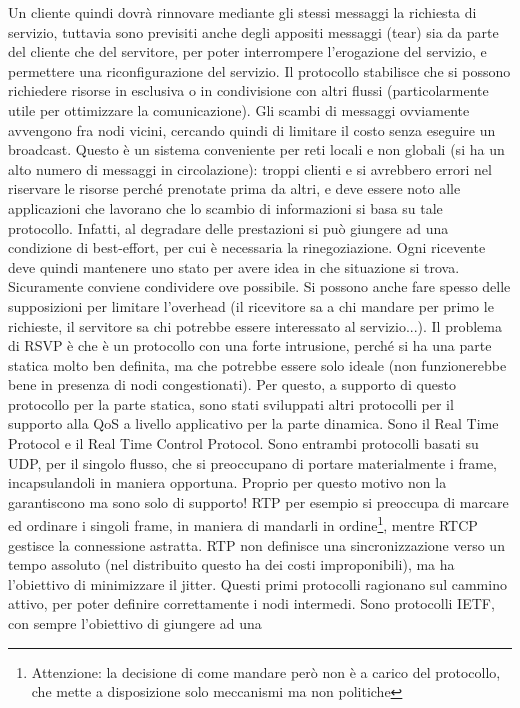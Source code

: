 Un cliente quindi dovrà rinnovare mediante gli stessi messaggi la richiesta di servizio, tuttavia sono previsiti anche
degli appositi messaggi (tear) sia da parte del cliente che del servitore, per poter interrompere l'erogazione del
servizio, e permettere una riconfigurazione del servizio. Il protocollo stabilisce che si possono richiedere risorse 
in esclusiva o in condivisione con altri flussi (particolarmente utile per ottimizzare la comunicazione). Gli scambi 
di messaggi ovviamente avvengono fra nodi vicini, cercando quindi di limitare il costo senza eseguire un broadcast.
Questo è un sistema conveniente per reti locali e non globali (si ha un alto numero di messaggi in circolazione): 
troppi clienti e si avrebbero errori nel riservare le risorse perché prenotate prima da altri, e deve essere noto alle
applicazioni che lavorano che lo scambio di informazioni si basa su tale protocollo. Infatti, al degradare delle
prestazioni si può giungere ad una condizione di best-effort, per cui è necessaria la rinegoziazione. Ogni ricevente
deve quindi mantenere uno stato per avere idea in che situazione si trova. Sicuramente conviene condividere ove
possibile. Si possono anche fare spesso delle supposizioni per limitare l'overhead (il ricevitore sa a chi mandare per
primo le richieste, il servitore sa chi potrebbe essere interessato al servizio...).
Il problema di RSVP è che è un protocollo con una forte intrusione, perché si ha una parte statica molto ben definita,
ma che potrebbe essere solo ideale (non funzionerebbe bene in presenza di nodi congestionati). Per questo, a supporto
di questo protocollo per la parte statica, sono stati sviluppati altri protocolli per il supporto alla QoS a livello
applicativo per la parte dinamica. Sono il Real Time Protocol e il Real Time Control Protocol. Sono entrambi protocolli
basati su UDP, per il singolo flusso, che si preoccupano di portare materialmente i frame, incapsulandoli in maniera
opportuna. Proprio per questo motivo non la garantiscono ma sono solo di supporto! RTP per esempio si preoccupa di
marcare ed ordinare i singoli frame, in maniera di mandarli in ordine\footnote{Attenzione: la decisione di come mandare
però non è a carico del protocollo, che mette a disposizione solo meccanismi ma non politiche}, mentre RTCP gestisce 
la connessione astratta. RTP non definisce una sincronizzazione verso un tempo assoluto (nel distribuito questo ha dei
costi improponibili), ma ha l'obiettivo di minimizzare il jitter. Questi primi protocolli ragionano sul cammino attivo,
per poter definire correttamente i nodi intermedi. Sono protocolli IETF, con sempre l'obiettivo di giungere ad una
